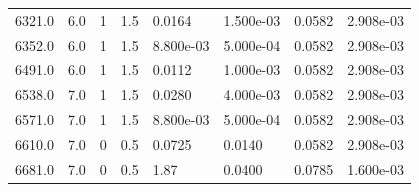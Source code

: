 \documentclass[preview]{standalone}
\begin{document}
{{{\begin{tabular}{L{1.2cm}C{1.2cm} C{0.3cm}C{0.5cm} C{1.4cm}C{1.4cm} C{1.4cm}C{1.4cm}}
  6321.0  &   6.0  & 1     & 1.5 &  0.0164  & 1.500e-03  & 0.0582 &  2.908e-03   \\ 
  6352.0  &   6.0  & 1     & 1.5 &  8.800e-03  & 5.000e-04  & 0.0582 &  2.908e-03   \\ 
  6491.0  &   6.0  & 1     & 1.5 &  0.0112  & 1.000e-03  & 0.0582 &  2.908e-03   \\ 
  6538.0  &   7.0  & 1     & 1.5 &  0.0280  & 4.000e-03  & 0.0582 &  2.908e-03   \\ 
  6571.0  &   7.0  & 1     & 1.5 &  8.800e-03  & 5.000e-04  & 0.0582 &  2.908e-03   \\ 
  6610.0  &   7.0  & 0     & 0.5 &  0.0725  & 0.0140  & 0.0582 &  2.908e-03   \\ 
  6681.0  &   7.0  & 0     & 0.5 &  1.87  & 0.0400  & 0.0785 &  1.600e-03   \\ 
\hline 
\end{tabular} 

}}}
\end{document}
